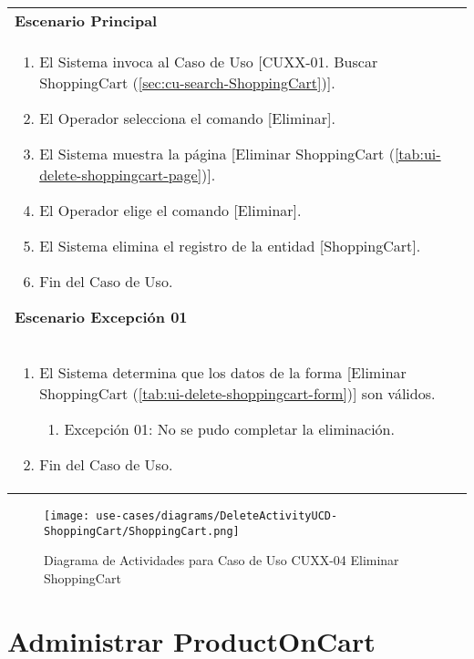 	\begin{tabular}{ p{15.5cm} }
		\textbf{Escenario Principal} \\
		\begin{enumerate}
			\item El Sistema invoca al Caso de Uso [CUXX-01. Buscar ShoppingCart (\ref{sec:cu-search-ShoppingCart})].
			\item El Operador selecciona el comando [Eliminar].
			\item El Sistema muestra la p\'agina [Eliminar ShoppingCart (\ref{tab:ui-delete-shoppingcart-page})].
			\item El Operador elige el comando [Eliminar].
			\item El Sistema elimina el registro de la entidad [ShoppingCart].
			\item Fin del Caso de Uso.
		\end{enumerate}
		\textbf{Escenario Excepci\'on 01} \\
		\begin{enumerate}
		   \item El Sistema determina que los datos de la forma [Eliminar ShoppingCart (\ref{tab:ui-delete-shoppingcart-form})] son v\'alidos.
		   	\begin{enumerate}
		   		\item Excepci\'on 01: No se pudo completar la eliminaci\'on.
		    \end{enumerate}
		   \item Fin del Caso de Uso.
		\end{enumerate}
	\end{tabular}
	
	\begin{figure}[H]
	  \begin{center}
		 \label{tab:activity-delete-ucd-entity-shoppingcart}
		 \texttt{[image: use-cases/diagrams/DeleteActivityUCD-ShoppingCart/ShoppingCart.png]}
		 \caption{Diagrama de Actividades para Caso de Uso CUXX-04 Eliminar ShoppingCart}
	  \end{center}
	\end{figure}
	
	\clearpage
	\section{Administrar ProductOnCart} \label{sec:cf-uc-admin-productoncart}
	
